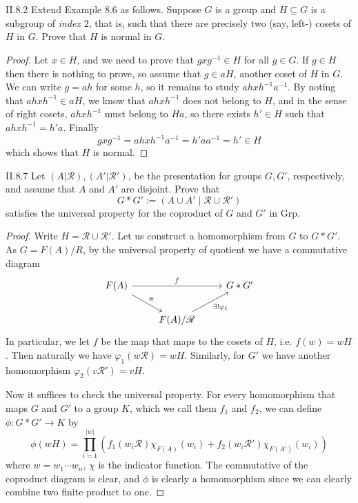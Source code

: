 \section{}

\begin{problem}{II.8.2}
Extend Example 8.6 as follows. Suppose $G$ is a group and $H \subseteq G$ is a subgroup of \emph{index} $2$, that is, such that there are precisely two (say, left-) cosets of $H$ in $G$. Prove that $H$ is normal in $G$.
\end{problem}
\begin{proof}
Let $x \in H$, and we need to prove that $gxg^{-1} \in H$ for all $g \in G$. If $g \in H$ then there is nothing to prove, so assume that $g \in aH$, another coset of $H$ in $G$. We can write $g = ah$ for some $h$, so it remains to study $ahxh^{-1}a^{-1}$. By noting that $ahxh^{-1} \in aH$, we know that $ahxh^{-1}$ does not belong to $H$, and in the sense of right cosets, $ahxh^{-1}$ must belong to $Ha$, so there exists $h' \in H$ such that $ahxh^{-1} = h'a$. Finally
\[
gxg^{-1} = ahxh^{-1}a^{-1} = h'aa^{-1} = h' \in H	
\]
which shows that $H$ is normal.
\end{proof}

\begin{problem}{II.8.7}
Let $(A|\mathscr{R}), (A'|\mathscr{R'})$, be the presentation for groups $G, G'$, respectively, and assume that $A$ and $A'$ are disjoint. Prove that
\[
G * G' := (A \cup A' \; |\; \mathscr{R} \cup \mathscr{R'})
\]
satisfies the universal property for the coproduct of $G$ and $G'$ in \textsf{Grp}.
\end{problem}
\begin{proof} Write $H = \mathscr{R} \cup \mathscr{R'}$. Let us construct a homomorphism from $G$ to $G * G'$. As $G = F(A)/R$, by the universal property of quotient we have a commutative diagram
\[
\begin{tikzcd}
F(A) \arrow[rr, "f"] \arrow[rd, "\pi"] &                                                   & G * G' \\
& F(A)/\mathscr{R} \arrow[ru, "\exists!\varphi_1"'] &       
\end{tikzcd}
\]
In particular, we let $f$ be the map that maps to the cosets of $H$, i.e. $f(w) = wH$. Then naturally we have $\varphi_1(w\mathscr{R}) = wH$. Similarly, for $G'$ we have another homomorphism $\varphi_2(v\mathscr{R}') = vH$.

Now it suffices to check the universal property. For every homomorphism that maps $G$ and $G'$ to a group $K$, which we call them $f_1$ and $f_2$, we can define $\phi : G * G' \to K$ by
\[ 
\phi(wH) = \prod_{i = 1}^{|w|} \left( f_1(w_i\mathscr{R}) \chi_{F(A)}(w_i) +  f_2(w_i\mathscr{R}') \chi_{F(A')}(w_i) \right)
\]
where $w = w_1 \cdots w_n$, $\chi$ is the indicator function. The commutative of the coproduct diagram is clear, and $\phi$ is clearly a homomorphism since we can clearly combine two finite product to one.
\end{proof}

